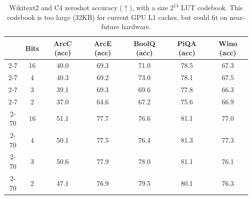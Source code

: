 \begin{table}[h]
\caption{Wikitext2 and C4 zeroshot accuracy ($\uparrow$), \qts with a size $2^{14}$ LUT codebook. This codebook is too large (32KB) for current GPU L1 caches, but could fit on near-future hardware.}
\centering
\begin{tabular}{@{}ccccccc@{}}
\toprule
     & Bits & ArcC (acc) & ArcE (acc) & BoolQ (acc) & PiQA (acc) & Wino (acc) \\ \midrule
2-7  & 16 & 40.0       & 69.3       & 71.0        & 78.5       & 67.3       \\
2-7  & 4 & 40.3       & 69.2       & 73.0        & 78.1       & 67.5       \\
2-7  & 3 & 39.1       & 69.3       & 69.6        & 77.8       & 66.3       \\
2-7  & 2 & 37.0       & 64.6       & 67.2        & 75.6       & 66.9       \\
2-70 & 16 & 51.1       & 77.7       & 76.6        & 81.1       & 77.0       \\
2-70 & 4 & 50.1       & 77.5       & 76.4        & 81.3       & 77.3       \\
2-70 & 3 & 50.6       & 77.9       & 78.0        & 81.1       & 76.1       \\
2-70 & 2 & 47.1       & 76.9       & 79.5        & 80.1       & 76.3       \\ \bottomrule
\end{tabular}
\label{tab:lutftzs}
\end{table}